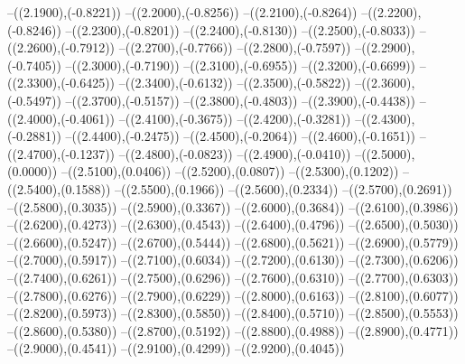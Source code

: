 {	--({\sx*(2.1900)},{\sy*(-0.8221)})
	--({\sx*(2.2000)},{\sy*(-0.8256)})
	--({\sx*(2.2100)},{\sy*(-0.8264)})
	--({\sx*(2.2200)},{\sy*(-0.8246)})
	--({\sx*(2.2300)},{\sy*(-0.8201)})
	--({\sx*(2.2400)},{\sy*(-0.8130)})
	--({\sx*(2.2500)},{\sy*(-0.8033)})
	--({\sx*(2.2600)},{\sy*(-0.7912)})
	--({\sx*(2.2700)},{\sy*(-0.7766)})
	--({\sx*(2.2800)},{\sy*(-0.7597)})
	--({\sx*(2.2900)},{\sy*(-0.7405)})
	--({\sx*(2.3000)},{\sy*(-0.7190)})
	--({\sx*(2.3100)},{\sy*(-0.6955)})
	--({\sx*(2.3200)},{\sy*(-0.6699)})
	--({\sx*(2.3300)},{\sy*(-0.6425)})
	--({\sx*(2.3400)},{\sy*(-0.6132)})
	--({\sx*(2.3500)},{\sy*(-0.5822)})
	--({\sx*(2.3600)},{\sy*(-0.5497)})
	--({\sx*(2.3700)},{\sy*(-0.5157)})
	--({\sx*(2.3800)},{\sy*(-0.4803)})
	--({\sx*(2.3900)},{\sy*(-0.4438)})
	--({\sx*(2.4000)},{\sy*(-0.4061)})
	--({\sx*(2.4100)},{\sy*(-0.3675)})
	--({\sx*(2.4200)},{\sy*(-0.3281)})
	--({\sx*(2.4300)},{\sy*(-0.2881)})
	--({\sx*(2.4400)},{\sy*(-0.2475)})
	--({\sx*(2.4500)},{\sy*(-0.2064)})
	--({\sx*(2.4600)},{\sy*(-0.1651)})
	--({\sx*(2.4700)},{\sy*(-0.1237)})
	--({\sx*(2.4800)},{\sy*(-0.0823)})
	--({\sx*(2.4900)},{\sy*(-0.0410)})
	--({\sx*(2.5000)},{\sy*(0.0000)})
	--({\sx*(2.5100)},{\sy*(0.0406)})
	--({\sx*(2.5200)},{\sy*(0.0807)})
	--({\sx*(2.5300)},{\sy*(0.1202)})
	--({\sx*(2.5400)},{\sy*(0.1588)})
	--({\sx*(2.5500)},{\sy*(0.1966)})
	--({\sx*(2.5600)},{\sy*(0.2334)})
	--({\sx*(2.5700)},{\sy*(0.2691)})
	--({\sx*(2.5800)},{\sy*(0.3035)})
	--({\sx*(2.5900)},{\sy*(0.3367)})
	--({\sx*(2.6000)},{\sy*(0.3684)})
	--({\sx*(2.6100)},{\sy*(0.3986)})
	--({\sx*(2.6200)},{\sy*(0.4273)})
	--({\sx*(2.6300)},{\sy*(0.4543)})
	--({\sx*(2.6400)},{\sy*(0.4796)})
	--({\sx*(2.6500)},{\sy*(0.5030)})
	--({\sx*(2.6600)},{\sy*(0.5247)})
	--({\sx*(2.6700)},{\sy*(0.5444)})
	--({\sx*(2.6800)},{\sy*(0.5621)})
	--({\sx*(2.6900)},{\sy*(0.5779)})
	--({\sx*(2.7000)},{\sy*(0.5917)})
	--({\sx*(2.7100)},{\sy*(0.6034)})
	--({\sx*(2.7200)},{\sy*(0.6130)})
	--({\sx*(2.7300)},{\sy*(0.6206)})
	--({\sx*(2.7400)},{\sy*(0.6261)})
	--({\sx*(2.7500)},{\sy*(0.6296)})
	--({\sx*(2.7600)},{\sy*(0.6310)})
	--({\sx*(2.7700)},{\sy*(0.6303)})
	--({\sx*(2.7800)},{\sy*(0.6276)})
	--({\sx*(2.7900)},{\sy*(0.6229)})
	--({\sx*(2.8000)},{\sy*(0.6163)})
	--({\sx*(2.8100)},{\sy*(0.6077)})
	--({\sx*(2.8200)},{\sy*(0.5973)})
	--({\sx*(2.8300)},{\sy*(0.5850)})
	--({\sx*(2.8400)},{\sy*(0.5710)})
	--({\sx*(2.8500)},{\sy*(0.5553)})
	--({\sx*(2.8600)},{\sy*(0.5380)})
	--({\sx*(2.8700)},{\sy*(0.5192)})
	--({\sx*(2.8800)},{\sy*(0.4988)})
	--({\sx*(2.8900)},{\sy*(0.4771)})
	--({\sx*(2.9000)},{\sy*(0.4541)})
	--({\sx*(2.9100)},{\sy*(0.4299)})
	--({\sx*(2.9200)},{\sy*(0.4045)})
}
